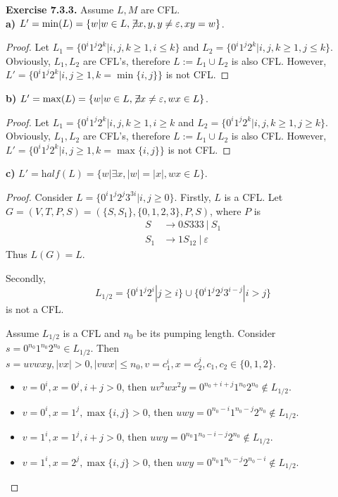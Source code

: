 \documentclass[a4paper]{article}
\newtheorem*{proof}{Proof}
\newenvironment{exercise}[1]{
	\par
	\noindent\textbf{Exercise #1.}\quad
}{
	\par
	\bigskip
}
\newcommand{\dv}{\ |\ }
\begin{document}
\begin{exercise}{7.3.3} Assume $L,M$ are CFL.\\
\textbf{a)} $L'=\min(L)=\{w|w\in L,\not\!\exists x,y,y\neq\varepsilon, xy=w\}$.
    \begin{proof}
        Let $L_1=\{0^i1^j2^k|i,j,k\geqslant 1,i\leqslant k\}$ and $L_2=\{0^i1^j2^k|i,j,k\geqslant 1,j\leqslant k\}$.
        Obviously, $L_1,L_2$ are CFL's, therefore $L:=L_1\cup L_2$ is also CFL. However,
        $L'=\{0^i1^j2^k|i,j\geqslant 1,k=\min\{i,j\}\}$ is not CFL.
    \end{proof}
\textbf{b)} $L'=\max(L)=\{w|w\in L,\not\!\exists x\neq\varepsilon,wx\in L\}$.
    \begin{proof}
        Let $L_1=\{0^i1^j2^k|i,j,k\geqslant 1,i\geqslant k$ and $L_2=\{0^i1^j2^k|i,j,k\geqslant 1,j\geqslant k\}$.
        Obviously, $L_1,L_2$ are CFL's, therefore $L:=L_1\cup L_2$ is also CFL. However,
        $L'=\{0^i1^j2^k|i,j\geqslant 1,k=\max\{i,j\}\}$ is not CFL.
    \end{proof}
\textbf{c)} $L'=\textit{half}(L)=\{w|\exists x,|w|=|x|,wx\in L\}$.
    \begin{proof}
        Consider $L=\{0^i1^j2^j3^{3i}|i,j\geqslant 0\}$. Firstly, $L$ is a CFL.
        Let $G=(V,T,P,S)=(\{S,S_1\},\{0,1,2,3\},P,S)$, where $P$ is
        \begin{align*}
            S &\to 0S333\dv S_1\\
            S_1 &\to 1S_12\dv \varepsilon
        \end{align*}
        Thus $L(G)=L$.\par
        Secondly,
        $$
        L_{1/2}=\{0^i1^j2^i|j\geqslant i\}\cup\{0^i1^j2^j3^{i-j}|i>j\}
        $$
        is not a CFL. \par
        Assume $L_{1/2}$ is a CFL and $n_0$ be its pumping length. Consider
        $s=0^{n_0}1^{n_0}2^{n_0}\in L_{1/2}$. Then $s=uvwxy, |vx|>0, |vwx|\leqslant n_0,v=c_1^i,x=c_2^j,c_1,c_2\in\{0,1,2\}$.
        \begin{itemize}
            \item $v=0^i,x=0^j,i+j>0$, then $uv^2wx^2y=0^{n_0+i+j}1^{n_0}2^{n_0}\notin L_{1/2}$.
            \item $v=0^i,x=1^j,\max\{i,j\}>0$, then $uwy=0^{n_0-i}1^{n_0-j}2^{n_0}\notin L_{1/2}$.
            \item $v=1^i,x=1^j,i+j>0$, then $uwy=0^{n_0}1^{n_0-i-j}2^{n_0}\notin L_{1/2}$.
            \item $v=1^i,x=2^j,\max\{i,j\}>0$, then $uwy=0^{n_0}1^{n_0-j}2^{n_0-i}\notin L_{1/2}$.

\end{itemize}
\end{proof}
\end{exercise}
\end{document}
